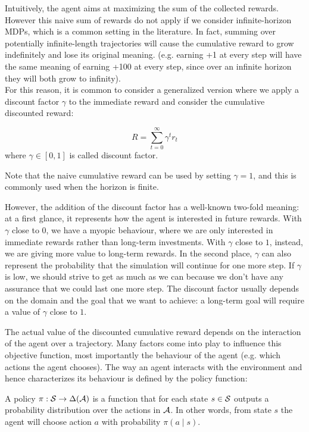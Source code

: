 Intuitively, the agent aims at maximizing the sum of the collected rewards. However this naive sum of rewards do not apply if we consider infinite-horizon MDPs, which is a common setting in the literature. In fact, summing over potentially infinite-length trajectories will cause the cumulative reward to grow indefinitely and lose its original meaning. (e.g. earning +1 at every step will have the same meaning of earning +100 at every step, since over an infinite horizon they will both grow to infinity).\\
For this reason, it is common to consider a generalized version where we apply a discount factor $\gamma$ to the immediate reward and consider the cumulative discounted reward:
\begin{definition}
\begin{equation*}
R = \sum_{t=0}^{\infty} \gamma^t r_t
\end{equation*}
where $\gamma \in [0,1]$ is called discount factor. 
\end{definition}
Note that the naive cumulative reward can be used by setting $\gamma=1$, and this is commonly used when the horizon is finite. 

However, the addition of the discount factor has a well-known two-fold meaning: at a first glance, it represents how the agent is interested in future rewards. With $\gamma$ close to $0$, we have a myopic behaviour, where we are only interested in immediate rewards rather than long-term investments. With $\gamma$ close to $1$, instead, we are giving more value to long-term rewards. In the second place, $\gamma$ can also represent the probability that the simulation will continue for one more step. If $\gamma$ is low, we should strive to get as much as we can because we don't have any assurance that we could last one more step.
The discount factor usually depends on the domain and the goal that we want to achieve: a long-term goal will require a value of $\gamma$ close to $1$.


The actual value of the discounted cumulative reward depends on the interaction of the agent over a trajectory. Many factors come into play to influence this objective function, most importantly the behaviour of the agent (e.g. which actions the agent chooses). The way an agent interacts with the environment and hence characterizes its behaviour is defined by the policy function:
\begin{definition}
A policy $\pi: \mathcal{S} \rightarrow \Delta (\mathcal{A})$ is a function that for each state $s \in \mathcal{S}$ outputs a probability distribution over the actions in $\mathcal{A}$. In other words, from state $s$ the agent will choose action $a$ with probability $\pi(a \mid s)$.
\end{definition}

